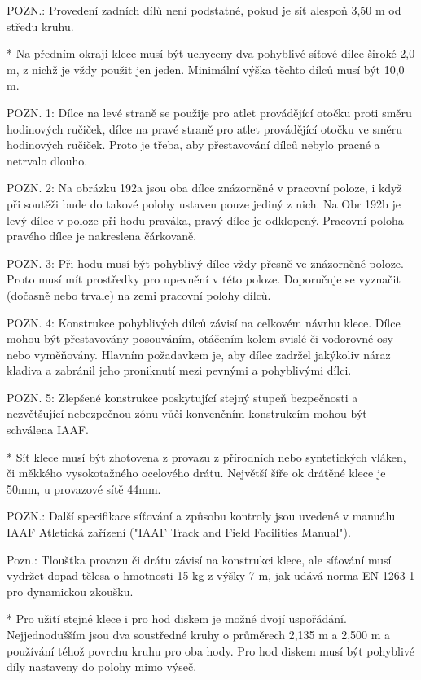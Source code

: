 POZN.: Provedení zadních dílů není podstatné, pokud je síť alespoň 3,50 m od středu kruhu.

* Na předním okraji klece musí být uchyceny dva pohyblivé síťové dílce široké 2,0 m, z nichž je vždy použit jen jeden. Minimální výška těchto dílců musí být 10,0 m.

POZN. 1: Dílce na levé straně se použije pro atlet provádějící otočku proti směru hodinových ručiček, dílce na pravé straně pro atlet provádějící otočku ve směru hodinových ručiček. Proto je třeba, aby přestavování dílců nebylo pracné a netrvalo dlouho.

POZN. 2: Na obrázku 192a jsou oba dílce znázorněné v pracovní poloze, i když při soutěži bude do takové polohy ustaven pouze jediný z nich. Na Obr 192b je levý dílec v poloze při hodu praváka, pravý dílec je odklopený. Pracovní poloha pravého dílce je nakreslena čárkovaně.

POZN. 3: Při hodu musí být pohyblivý dílec vždy přesně ve znázorněné poloze. Proto musí mít prostředky pro upevnění v této poloze. Doporučuje se vyznačit (dočasně nebo trvale) na zemi pracovní polohy dílců.

POZN. 4: Konstrukce pohyblivých dílců závisí na celkovém návrhu klece. Dílce mohou být přestavovány posouváním, otáčením kolem svislé či vodorovné osy nebo vyměňovány. Hlavním požadavkem je, aby dílec zadržel jakýkoliv náraz kladiva a zabránil jeho proniknutí mezi pevnými a pohyblivými dílci.

POZN. 5: Zlepšené konstrukce poskytující stejný stupeň bezpečnosti a nezvětšující nebezpečnou zónu vůči konvenčním konstrukcím mohou být schválena IAAF.

* Síť klece musí být zhotovena z provazu z přírodních nebo syntetických vláken, či měkkého vysokotažného ocelového drátu. Největší šíře ok drátěné klece je 50mm, u provazové sítě 44mm.

POZN.: Další specifikace síťování a způsobu kontroly jsou uvedené v manuálu IAAF Atletická zařízení ("IAAF Track and Field Facilities Manual").

Pozn.: Tloušťka provazu či drátu závisí na konstrukci klece, ale síťování musí vydržet dopad tělesa o hmotnosti 15 kg z výšky 7 m, jak udává norma EN 1263-1 pro dynamickou zkoušku.

* Pro užití stejné klece i pro hod diskem je možné dvojí uspořádání. Nejjednodušším jsou dva soustředné kruhy o průměrech 2,135 m a 2,500 m a používání téhož povrchu kruhu pro oba hody. Pro hod diskem musí být pohyblivé díly nastaveny do polohy mimo výseč.

